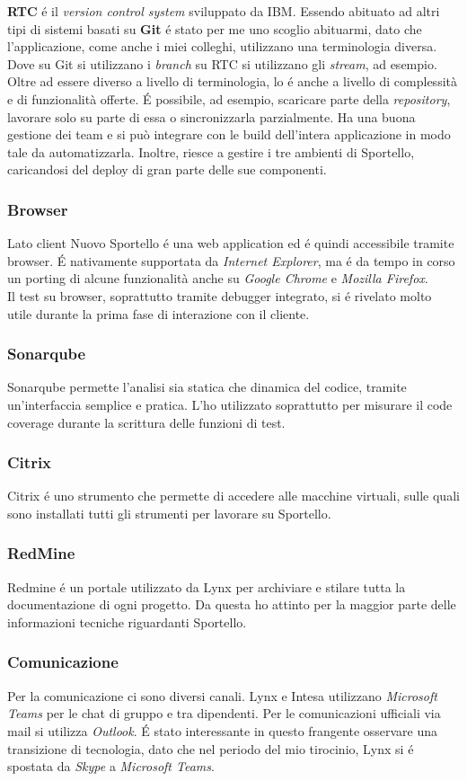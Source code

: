 \textbf{RTC} é il \textit{version control system} sviluppato da IBM. Essendo abituato ad altri tipi di sistemi basati su \textbf{Git} é stato per me uno scoglio abituarmi, dato che l'applicazione, come anche i miei colleghi, utilizzano una terminologia diversa. Dove su Git si utilizzano i \textit{branch} su RTC si utilizzano gli \textit{stream}, ad esempio. Oltre ad essere diverso a livello di terminologia, lo é anche a livello di complessità e di funzionalità offerte. É possibile, ad esempio, scaricare parte della \textit{repository}, lavorare solo su parte di essa o sincronizzarla parzialmente. Ha una buona gestione dei team e si può integrare con le build dell'intera applicazione in modo tale da automatizzarla. Inoltre, riesce a gestire i tre ambienti di Sportello, caricandosi del deploy di gran parte delle sue componenti. 

\subsubsection{Browser}
Lato client Nuovo Sportello é una web application ed é quindi accessibile tramite browser. É nativamente supportata da \textit{Internet Explorer}, ma é da tempo in corso un porting di alcune funzionalità anche su \textit{Google Chrome} e \textit{Mozilla Firefox}. \\
Il test su browser, soprattutto tramite debugger integrato, si é rivelato molto utile durante la prima fase di interazione con il cliente. 

\subsubsection{Sonarqube}
Sonarqube permette l'analisi sia statica che dinamica del codice, tramite un'interfaccia semplice e pratica. L'ho utilizzato soprattutto per misurare il code coverage durante la scrittura delle funzioni di test. 

\subsubsection{Citrix}
Citrix é uno strumento che permette di accedere alle macchine virtuali, sulle quali sono installati tutti gli strumenti per lavorare su Sportello. 

\subsubsection{RedMine}
Redmine é un portale utilizzato da Lynx per archiviare e stilare tutta la documentazione di ogni progetto. Da questa ho attinto per la maggior parte delle informazioni tecniche riguardanti Sportello.

\subsubsection{Comunicazione}
Per la comunicazione ci sono diversi canali. Lynx e Intesa utilizzano \textit{Microsoft Teams} per le chat di gruppo e tra dipendenti. Per le comunicazioni ufficiali via mail si utilizza \textit{Outlook}. É stato interessante in questo frangente osservare una transizione di tecnologia, dato che nel periodo del mio tirocinio, Lynx si é spostata da \textit{Skype} a \textit{Microsoft Teams}.
